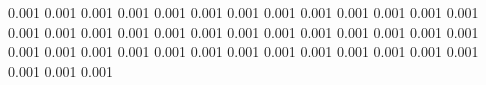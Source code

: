 0.001      0.001      %
0.001      0.001      %
0.001      0.001      %
0.001      0.001      %
0.001      0.001      %
0.001      0.001      %
0.001      0.001      %
0.001      0.001      %
0.001      0.001      %
0.001      0.001      %
0.001      0.001      %
0.001      0.001      %
0.001      0.001      %
0.001      0.001      %
0.001      0.001      %
0.001      0.001      %
0.001      0.001      %
0.001      0.001      %
0.001      0.001      %
0.001      0.001      %
0.001      0.001      %
